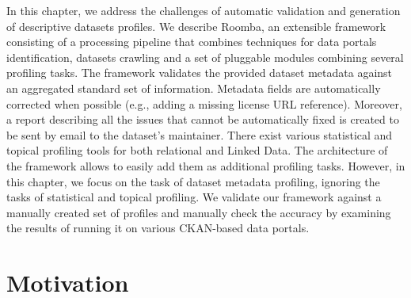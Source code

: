 In this chapter, we address the challenges of automatic validation and generation of descriptive datasets profiles. We describe Roomba, an extensible framework consisting of a processing pipeline that combines techniques for data portals identification, datasets crawling and a set of pluggable modules combining several profiling tasks. The framework validates the provided dataset metadata against an aggregated standard set of information. Metadata fields are automatically corrected when possible (e.g., adding a missing license URL reference). Moreover, a report describing all the issues that cannot be automatically fixed is created to be sent by email to the dataset's maintainer. There exist various statistical and topical profiling tools for both relational and Linked Data. The architecture of the framework allows to easily add them as additional profiling tasks. However, in this chapter, we focus on the task of dataset metadata profiling, ignoring the tasks of statistical and topical profiling. We validate our framework against a manually created set of profiles and manually check the accuracy by examining the results of running it on various CKAN-based data portals.


\section{Motivation}

